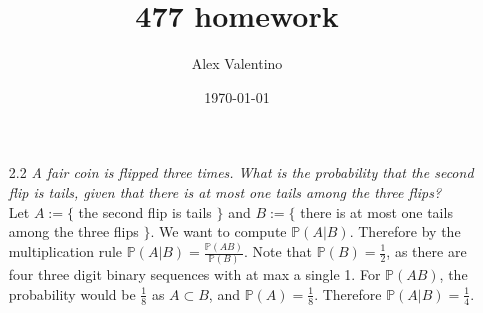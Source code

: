 \documentclass[12pt, letterpaper]{article}
\date{\today}
\author{Alex Valentino}
\title{477 homework}
\newcommand{\Pro}{\mathbb{P}}
\begin{document}
\begin{enumerate}
	\item[2.2] \textit{A fair coin is flipped three times. What is the probability that
the second flip is tails, given that there is at most one tails among the three
flips?}\\
	Let $A := \{$ the second flip is tails $\}$ and $B := \{$ there is at most one tails among the three flips $\}$.  We want to compute $\Pro(A | B)$.  Therefore by the multiplication rule $\Pro(A | B) = \frac{\Pro(AB)}{\Pro(B)}$.  Note that $\Pro(B) = \frac{1}{2}$, as there are four three digit binary sequences with at max a single 1.  For $\Pro(AB)$, the probability would be $\frac{1}{8}$ as $A \subset B$, and $\Pro(A) = \frac{1}{8}$.  Therefore $\Pro(A|B) = \frac{1}{4}$.  
\end{enumerate}
\end{document}
